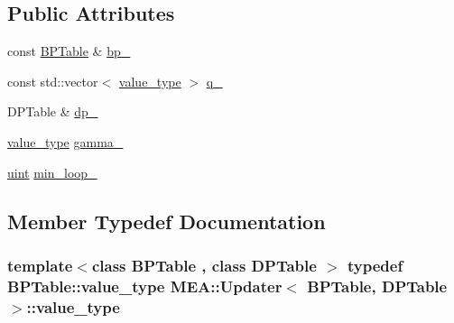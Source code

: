 \subsection*{Public Attributes}
\begin{DoxyCompactItemize}
\item 
const \hyperlink{folding__engine_8h_a065821fb17bbd8df315f2435c973e3c1}{B\+P\+Table} \& \hyperlink{struct_m_e_a_1_1_updater_a49f2733a73cd8c11eff32a876d026e01}{bp\+\_\+}
\item 
const std\+::vector$<$ \hyperlink{struct_m_e_a_1_1_updater_a34ff27ad742334ae0d3f317810362f2a}{value\+\_\+type} $>$ \hyperlink{struct_m_e_a_1_1_updater_a06a1f82c408b0c63fb2e56f1fffa4cea}{q\+\_\+}
\item 
D\+P\+Table \& \hyperlink{struct_m_e_a_1_1_updater_ab78089f3d41c25887c7586de0b1e1910}{dp\+\_\+}
\item 
\hyperlink{struct_m_e_a_1_1_updater_a34ff27ad742334ae0d3f317810362f2a}{value\+\_\+type} \hyperlink{struct_m_e_a_1_1_updater_a098bbe27695679391e12aaf0ec72d274}{gamma\+\_\+}
\item 
\hyperlink{cyktable_8h_a91ad9478d81a7aaf2593e8d9c3d06a14}{uint} \hyperlink{struct_m_e_a_1_1_updater_a8831f08c5d04f9fd05d1d9dd284af641}{min\+\_\+loop\+\_\+}
\end{DoxyCompactItemize}


\subsection{Member Typedef Documentation}
\hypertarget{struct_m_e_a_1_1_updater_a34ff27ad742334ae0d3f317810362f2a}{
\subsubsection[{value\+\_\+type}]{\setlength{\rightskip}{0pt plus 5cm}template$<$class B\+P\+Table , class D\+P\+Table $>$ typedef {\bf B\+P\+Table\+::value\+\_\+type} {\bf M\+E\+A\+::\+Updater}$<$ {\bf B\+P\+Table}, D\+P\+Table $>$\+::{\bf value\+\_\+type}}}\label{struct_m_e_a_1_1_updater_a34ff27ad742334ae0d3f317810362f2a}


